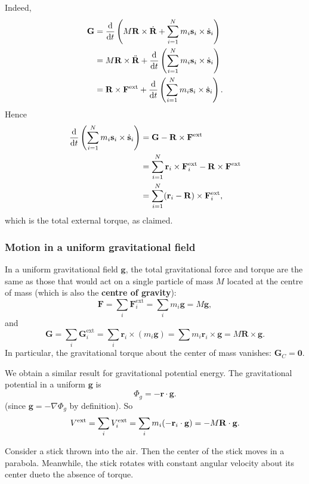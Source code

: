 Indeed, 
\begin{align*}
  {\bf G}&=\frac{\mathrm{d}}{\mathrm{d}t}\left( M{\bf R}\times\dot{{\bf R}}+\sum_{i=1}^{N}m_i{\bf s}_i\times \dot{{\bf s}}_i \right)\\ 
  &= M{\bf R} \times \ddot{{\bf R}} + \frac{\mathrm{d}}{\mathrm{d}t}\left( \sum_{i=1}^{N}m_i{\bf s}_i\times \dot{{\bf s}}_i \right)\\ 
  &= {\bf R} \times {\bf F}^{\text{ext}} +\frac{\mathrm{d}}{\mathrm{d}t}\left( \sum_{i=1}^{N}m_i{\bf s}_i\times \dot{{\bf s}}_i \right). 
\end{align*}
Hence 
\begin{align*}
  \frac{\mathrm{d}}{\mathrm{d}t}\left( \sum_{i=1}^{N}m_i{\bf s}_i\times \dot{{\bf s}}_i \right)&= {\bf G}-{\bf R} \times {\bf F}^{\text{ext}}\\ 
  &= \sum_{i=1}^{N}{\bf r}_i \times {\bf F}_i^{\text{ext}} - {\bf R} \times {\bf F}^{\text{ext}}\\ 
  &= \sum_{i=1}^{N}({\bf r}_i-{\bf R})\times {\bf F}_i^{\text{ext}},
\end{align*}
which is the total external torque, as claimed.

\subsubsection*{Motion in a uniform gravitational field}

In a uniform gravitational field $\mathbf{g}$, the total gravitational force and torque are the same as those that would act on a single particle of mass $M$ located at the centre of mass (which is also the \textbf{centre of gravity}):
\[
  \mathbf{F} = \sum_i \mathbf{F}_i^{\mathrm{ext}} = \sum_i m_i \mathbf{g} = M\mathbf{g},
\]
and 
\[
  \mathbf{G} = \sum_i \mathbf{G}_i^{\mathrm{ext}} = \sum_i \mathbf{r}_i \times (m_i \mathbf{g}) = \sum m_i \mathbf{r}_i \times \mathbf{g} = M\mathbf{R}\times \mathbf{g}.
\]
In particular, the gravitational torque about the center of mass vanishes: $\mathbf{G}_C = \mathbf{0}$.

We obtain a similar result for gravitational potential energy. The gravitational potential in a uniform $\mathbf{g}$ is
\[
  \Phi_g = -\mathbf{r}\cdot \mathbf{g}.
\]
(since $\mathbf{g} = -\nabla \Phi_g$ by definition). So
\[
  V^{\mathrm{ext}} = \sum_i V_i^{\mathrm{ext}}
  = \sum_i m_i (- \mathbf{r}_i \cdot \mathbf{g})
  = -M{\bf R}\cdot{\bf g} .
\]

\begin{example}
  Consider a stick thrown into the air. Then the center of the stick moves in a parabola. Meanwhile, the stick rotates with constant angular velocity about its center dueto the absence of torque.
\end{example}